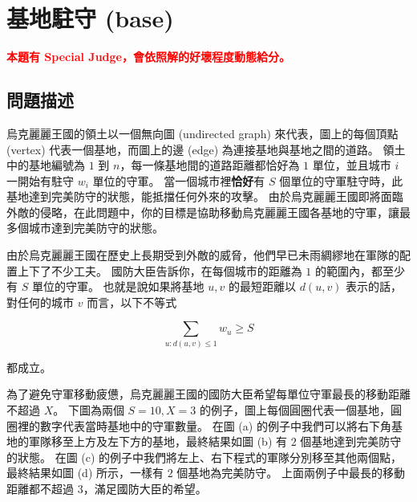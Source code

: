 \section{基地駐守 (base)}

\textcolor{red}{\textbf{本題有 Special Judge，會依照解的好壞程度動態給分。}}

\subsection{問題描述}

烏克麗麗王國的領土以一個無向圖 (undirected graph) 來代表，圖上的每個頂點
(vertex) 代表一個基地，而圖上的邊 (edge) 為連接基地與基地之間的道路。
領土中的基地編號為 \(1\) 到 \(n\)，每一條基地間的道路距離都恰好為 \(1\)
單位，並且城巿 \(i\) 一開始有駐守 \(w_i\) 單位的守軍。
當一個城巿裡\textbf{恰好}有 \(S\)
個單位的守軍駐守時，此基地達到完美防守的狀態，能抵擋任何外來的攻擊。
由於烏克麗麗王國即將面臨外敵的侵略，在此問題中，你的目標是協助移動烏克麗麗王國各基地的守軍，讓最多個城巿達到完美防守的狀態。

由於烏克麗麗王國在歷史上長期受到外敵的威脅，他們早已未雨綢繆地在軍隊的配置上下了不少工夫。
國防大臣告訴你，在每個城巿的距離為 \(1\) 的範圍內，都至少有 \(S\)
單位的守軍。 也就是說如果將基地 \(u, v\) 的最短距離以 \(d(u, v)\)
表示的話，對任何的城巿 \(v\) 而言，以下不等式

\[\sum_{u:d(u,v) \le 1} w_u \ge S\]

\noindent 都成立。

為了避免守軍移動疲憊，烏克麗麗王國的國防大臣希望每單位守軍最長的移動距離不超過
\(X\)。 下圖為兩個 \(S = 10, X = 3\)
的例子，圖上每個圓圈代表一個基地，圓圈裡的數字代表當時基地中的守軍數量。
在圖 (a)
的例子中我們可以將右下角基地的軍隊移至上方及左下方的基地，最終結果如圖
(b) 有 \(2\) 個基地達到完美防守的狀態。 在圖 (c)
的例子中我們將左上、右下程式的軍隊分別移至其他兩個點，最終結果如圖 (d)
所示，一樣有 \(2\) 個基地為完美防守。 上面兩例子中最長的移動距離都不超過
\(3\)，滿足國防大臣的希望。

